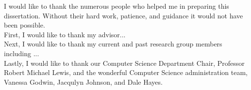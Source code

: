 \large
\noindent I would like to thank the numerous people who helped me in preparing this dissertation.  Without their hard work, patience, and guidance it would not have been possible. \\

\noindent  First, I would like to thank my advisor...\\ 

\noindent  Next, I would like to thank my current and past research group members including ... \\

\noindent Lastly, I would like to thank our Computer Science Department Chair, Professor Robert Michael Lewis, and the wonderful Computer Science administration team, Vanessa Godwin, Jacqulyn Johnson, and Dale Hayes. \\


